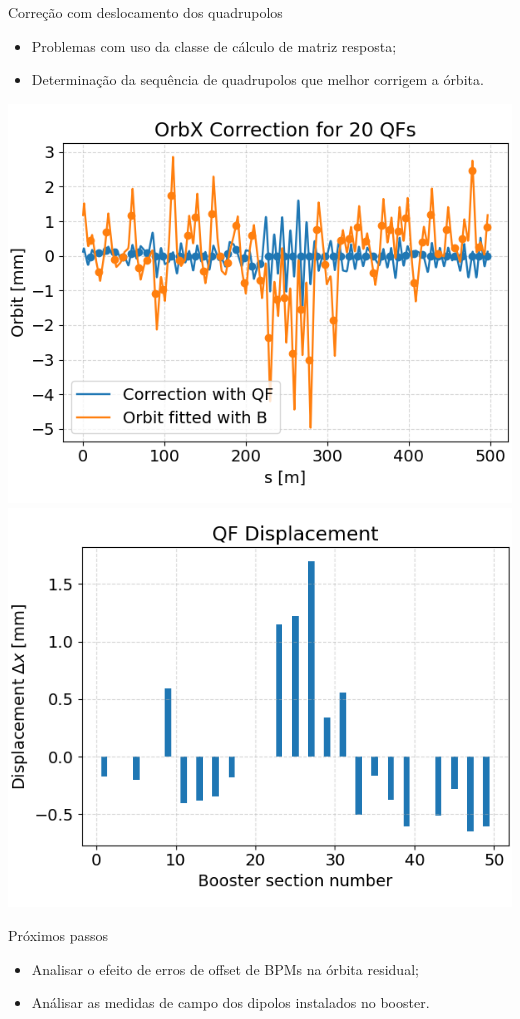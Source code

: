 \documentclass[aspectratio=169]{beamer}            %
\begin{document}
\begin{frame}{Correção com deslocamento dos quadrupolos}
    \begin{itemize}
        \item Problemas com uso da classe de cálculo de matriz resposta;
        \item Determinação da sequência de quadrupolos que melhor corrigem a órbita.
    \end{itemize}
    \begin{minipage}{\textwidth}
        \includegraphics[width=0.5\linewidth]{2024-05-10/figures/qf_orbit_correction.png}
        \includegraphics[width=0.5\linewidth]{2024-05-10/figures/qf_displacement.png}
    \end{minipage}
    Próximos passos
    \begin{itemize}
        \item Analisar o efeito de erros de offset de BPMs na órbita residual;
        \item Análisar as medidas de campo dos dipolos instalados no booster.
    \end{itemize}
\end{frame}
\end{document}
